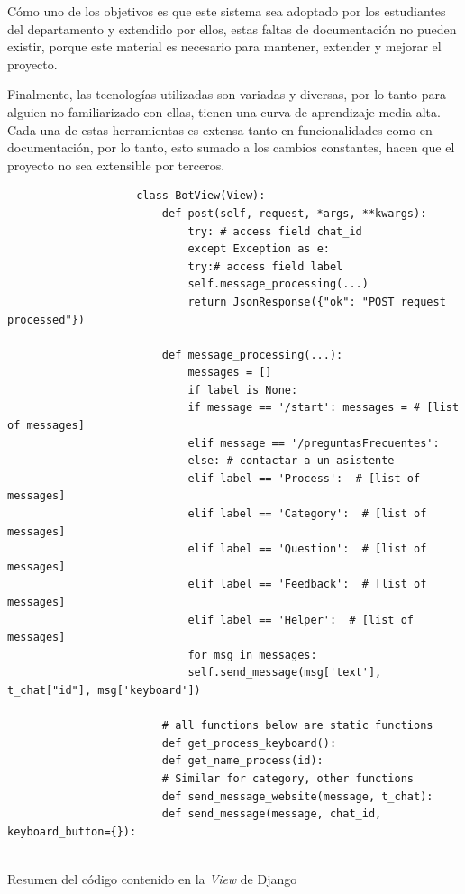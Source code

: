             \par Cómo uno de los objetivos es que este sistema sea adoptado por los estudiantes del departamento y extendido por ellos, estas faltas de documentación no pueden existir, porque este material es necesario para mantener, extender y mejorar el proyecto.
            
            \par Finalmente, las tecnologías utilizadas son variadas y diversas, por lo tanto para alguien no familiarizado con ellas, tienen una curva de aprendizaje media alta. Cada una de estas herramientas es extensa tanto en funcionalidades como en documentación, por lo tanto, esto sumado a los cambios constantes, hacen que el proyecto no sea extensible por terceros.

            \begin{listing}
                \begin{verbatim}
                    class BotView(View):
                        def post(self, request, *args, **kwargs):
                            try: # access field chat_id
                            except Exception as e:
                            try:# access field label
                            self.message_processing(...)
                            return JsonResponse({"ok": "POST request processed"})
        
                        def message_processing(...):
                            messages = []
                            if label is None:
                            if message == '/start': messages = # [list of messages]
                            elif message == '/preguntasFrecuentes':
                            else: # contactar a un asistente
                            elif label == 'Process':  # [list of messages]
                            elif label == 'Category':  # [list of messages]
                            elif label == 'Question':  # [list of messages]
                            elif label == 'Feedback':  # [list of messages]
                            elif label == 'Helper':  # [list of messages]
                            for msg in messages:
                            self.send_message(msg['text'], t_chat["id"], msg['keyboard'])
        
                        # all functions below are static functions
                        def get_process_keyboard():
                        def get_name_process(id):
                        # Similar for category, other functions
                        def send_message_website(message, t_chat):
                        def send_message(message, chat_id, keyboard_button={}):
                    
                \end{verbatim}
                 \caption[View sistema anterior]{Resumen del código contenido en la \textit{View} de \gls{Django}}
                 \label{list:view}
            \end{listing}
        

